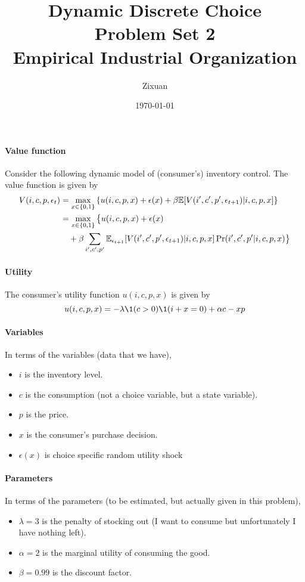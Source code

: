 \documentclass[12pt]{article}[margin=1in]
\title{\textbf{Dynamic Discrete Choice} \\
\vspace{.3cm}
\large Problem Set 2 \\
Empirical Industrial Organization}
\author{Zixuan}
\date{\today}
\begin{document}
\maketitle

\setcounter{page}{1}

\paragraph{Value function} Consider the following dynamic model of (consumer's) inventory control. The
value function is given by
\begin{equation*}
    \begin{split}
        V(i,c,p,\epsilon_t) & = \max_{x \in \{0,1\}} \left\{ u(i,c,p,x) + \epsilon(x)+ \beta \mathbb{E}[V(i',c',p',\epsilon_{t+1})|i,c,p,x] \right\}     \\
                            & = \max_{x \in \{0,1\}} \big\{ u(i,c,p,x) + \epsilon(x)                                                             \\
                            & \quad + \beta \sum_{i',c',p'}\mathbb{E}_{\epsilon_{t+1}}[V(i',c',p',\epsilon_{t+1})|i,c,p,x] \Pr(i', c',p'|i,c,p,x) \big\}
    \end{split}
\end{equation*}
\paragraph{Utility} The consumer's utility function $u(i,c,p,x)$ is given by
\begin{equation*}
    u(i,c,p,x) = -\lambda \1(c>0)\1(i+x=0) + \alpha c -xp
\end{equation*}
\paragraph{Variables} In terms of the variables (data that we have),
\begin{itemize}
    \item $i$ is the inventory level.
    \item $c$ is the consumption (not a choice variable, but a state variable).
    \item $p$ is the price.
    \item $x$ is the consumer's purchase decision.
    \item $\epsilon(x)$ is choice specific random utility shock
\end{itemize}
\paragraph{Parameters} In terms of the parameters (to be estimated, but actually given in this
problem),
\begin{itemize}
    \item $\lambda=3$ is the penalty of stocking out (I want to consume but unfortunately I have nothing left).
    \item $\alpha=2$ is the marginal utility of consuming the good.
    \item $\beta=0.99$ is the discount factor.
\end{itemize}
\end{document}
